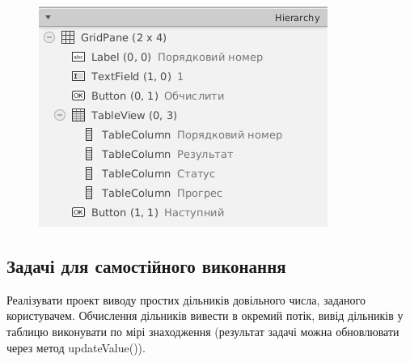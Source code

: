 \begin{enumerate}
	\begin{figure}[h]
		\includegraphics{chapter21/images/image7.png}
		\caption{}
		\label{fig:image7}
	\end{figure}
	
\end{enumerate}

\subsection{Задачі для самостійного виконання}
Реалізувати проект виводу простих дільників довільного числа, заданого користувачем. Обчислення дільників вивести в окремий потік, вивід дільників у таблицю виконувати по мірі знаходження (результат  задачі можна обновлювати через метод updateValue()).